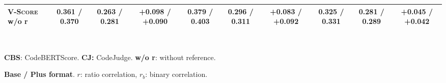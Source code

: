 \begin{table}[t]
\begin{tabular}{@{}
        l|ccc|ccc|ccc@{}}
        \textsc{V-Score} w/o r  & 0.361 / 0.370   & 0.263 / 0.281   & +0.098 / +0.090                     & 0.379 / 0.403   & 0.296 / 0.311   & +0.083 / +0.092                     & 0.325 / 0.331   & 0.281 / 0.289   & +0.045 / +0.042                     \\
        \bottomrule
    \end{tabular}\\
    \begin{description}[itemsep=-3pt,topsep=0pt]
        \item \textbf{CBS}: CodeBERTScore. \hspace{10pt}  \textbf{CJ:} CodeJudge. \hspace{10pt} \textbf{w/o r}: without reference.
        \item \textbf{Base / Plus format}. $r$: ratio correlation, $r_b$: binary correlation.
    \end{description}
\end{table}